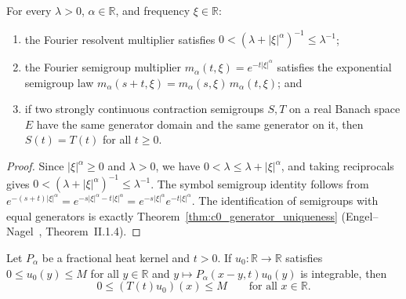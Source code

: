 \begin{theorem}\label{thm:fourier_symbols}
\leanok
For every $\lambda > 0$, $\alpha \in \mathbb{R}$, and frequency $\xi \in \mathbb{R}$:
\begin{enumerate}
  \item the Fourier resolvent multiplier satisfies $0 < (\lambda + \lvert \xi \rvert^\alpha)^{-1} \le \lambda^{-1}$;
  \item the Fourier semigroup multiplier $m_\alpha(t, \xi) = e^{-t \lvert \xi \rvert^\alpha}$ satisfies the exponential semigroup law $m_\alpha(s + t, \xi) = m_\alpha(s, \xi)\, m_\alpha(t, \xi)$; and
  \item if two strongly continuous contraction semigroups $S, T$ on a real Banach space $E$ have the same generator domain and the same generator on it, then $S(t) = T(t)$ for all $t \ge 0$.
\end{enumerate}
\end{theorem}

\begin{proof}
\leanok
Since $\lvert \xi \rvert^\alpha \ge 0$ and $\lambda > 0$, we have $0 < \lambda \le \lambda + \lvert \xi \rvert^\alpha$, and taking reciprocals gives $0 < (\lambda + \lvert \xi \rvert^\alpha)^{-1} \le \lambda^{-1}$. The symbol semigroup identity follows from $e^{-(s+t)\lvert \xi \rvert^\alpha} = e^{-s\lvert \xi \rvert^\alpha - t\lvert \xi \rvert^\alpha} = e^{-s\lvert \xi \rvert^\alpha} e^{-t\lvert \xi \rvert^\alpha}$. The identification of semigroups with equal generators is exactly Theorem~\ref{thm:c0_generator_uniqueness} (Engel--Nagel~\cite{engel}, Theorem~II.1.4).
\end{proof}

\begin{theorem}\label{thm:whole_line_markov}
\leanok
Let $P_\alpha$ be a fractional heat kernel and $t > 0$. If $u_0 : \mathbb{R} \to \mathbb{R}$ satisfies $0 \le u_0(y) \le M$ for all $y \in \mathbb{R}$ and $y \mapsto P_\alpha(x - y, t) u_0(y)$ is integrable, then
\[
  0 \le (T(t) u_0)(x) \le M \qquad \text{for all } x \in \mathbb{R}.
\]
\end{theorem}

